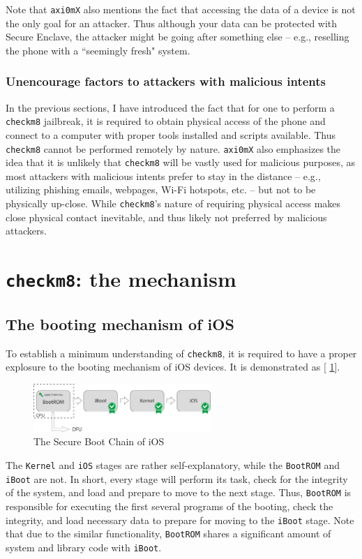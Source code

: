 \documentclass[10pt]{article}
\newcommand{\inlinecode}{\texttt}
\begin{document}
Note that \inlinecode{axi0mX} also mentions the fact that accessing the data of a device is not the only goal for an attacker. Thus although your data can be protected with Secure Enclave, the attacker might be going after something else -- e.g., reselling the phone with a ``seemingly fresh" system.

\subsubsection{Unencourage factors to attackers with malicious intents}
In the previous sections, I have introduced the fact that for one to perform a \inlinecode{checkm8} jailbreak, it is required to obtain physical access of the phone and connect to a computer with proper tools installed and scripts available. Thus \inlinecode{checkm8} cannot be performed remotely by nature. \inlinecode{axi0mX} also emphasizes the idea that it is unlikely that \inlinecode{checkm8} will be vastly used for malicious purposes, as most attackers with malicious intents prefer to stay in the distance -- e.g., utilizing phishing emails, webpages, Wi-Fi hotspots, etc. -- but not to be physically up-close. While \inlinecode{checkm8}'s nature of requiring physical access makes close physical contact inevitable, and thus likely not preferred by malicious attackers.

\section{\inlinecode{checkm8}: the mechanism}
\subsection{The booting mechanism of iOS}

To establish a minimum understanding of \inlinecode{checkm8}, it is required to have a proper explosure to the booting mechanism of iOS devices. It is demonstrated as [\figurename{ \ref{figure_1}}].
\begin{figure}[!ht]
    \centering
    \includegraphics[width = 0.6\textwidth]{figure_1}
    \caption{The Secure Boot Chain of iOS}
    \label{figure_1}
\end{figure}

The \inlinecode{Kernel} and \inlinecode{iOS} stages are rather self-explanatory, while the \inlinecode{BootROM} and \inlinecode{iBoot} are not. In short, every stage will perform its task, check for the integrity of the system, and load and prepare to move to the next stage. Thus, \inlinecode{BootROM} is responsible for executing the first several programs of the booting, check the integrity, and load necessary data to prepare for moving to the \inlinecode{iBoot} stage. Note that due to the similar functionality, \inlinecode{BootROM} shares a significant amount of system and library code with \inlinecode{iBoot}.
\end{document}

